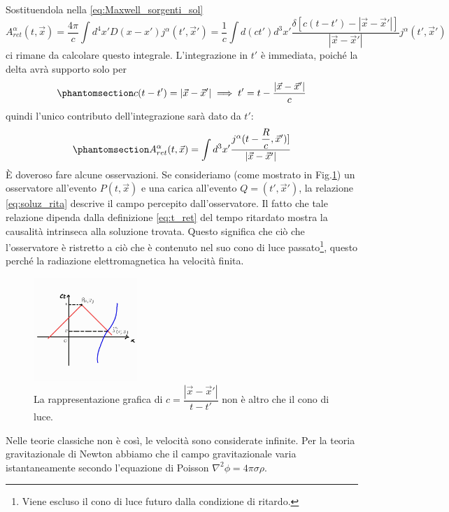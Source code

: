 Sostituendola nella \eqref{eq:Maxwell_sorgenti_sol}
\begin{equation}
  A_{ret}^\alpha(t,\Vec{x})=\dfrac{4\pi}{c}\int d^4x'D(x-x')j^\alpha(t',\Vec{x}')=\dfrac{1}{c}\int d(ct')d^3x'\dfrac{\delta[c(t-t')-|\Vec{x}-\Vec{x}'|]}{|\Vec{x}-\Vec{x}'|}j^\alpha(t',\Vec{x}')
\end{equation}
ci rimane da calcolare questo integrale. L'integrazione in $t'$ è immediata, poiché la delta avrà supporto solo per 
\begin{equation}\phantomsection\label{eq:t_ret}
    c(t-t')=|\Vec{x}-\Vec{x}'| \implies t'=t-\dfrac{|\Vec{x}-\Vec{x}'|}{c}
\end{equation}
quindi l'unico contributo dell'integrazione sarà dato da $t'$:
\begin{equation}\phantomsection\label{eq:soluz_rita}
  A_{ret}^\alpha(t,\Vec{x})=\int d^3x'\dfrac{j^\alpha(t-\dfrac{R}{c},\Vec{x}')]}{|\Vec{x}-\Vec{x}'|}
\end{equation}
\`E doveroso fare alcune osservazioni. Se consideriamo (come mostrato in Fig.\ref{fig:Green}) un osservatore all'evento $P(t,\Vec{x})$ e una carica all'evento $Q=(t',\Vec{x}')$, la relazione \eqref{eq:soluz_rita} descrive il campo percepito dall'osservatore. Il fatto che tale relazione dipenda dalla definizione \eqref{eq:t_ret} del tempo ritardato mostra la causalità intrinseca alla soluzione trovata. Questo significa che ciò che l'osservatore  è ristretto a ciò che è contenuto nel suo cono di luce passato\footnote{Viene escluso il cono di luce futuro dalla condizione di ritardo.}, questo perché la radiazione elettromagnetica ha velocità finita.
\begin{figure}[H]
    \centering
    \includegraphics[width=0.35\textwidth]{Immagini/Green.jpg}
    \caption{La rappresentazione grafica di $c=\dfrac{|\Vec{x}-\Vec{x}'|}{t-t'}$ non è altro che il cono di luce.}
    \label{fig:Green}
\end{figure}
Nelle teorie classiche non è così, le velocità sono considerate infinite. Per la teoria gravitazionale di Newton abbiamo che il campo gravitazionale varia istantaneamente secondo l'equazione di Poisson $\nabla^2\phi=4\pi\sigma\rho$.
 

